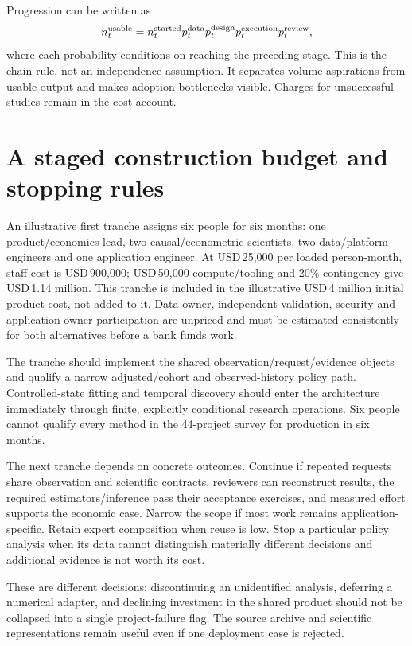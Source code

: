 Progression can be written as
\[
 n_t^{\rm usable}=n_t^{\rm started}
 p_t^{\rm data}p_t^{\rm design}p_t^{\rm execution}p_t^{\rm review},
\]
where each probability conditions on reaching the preceding stage.
This is the chain rule, not an independence assumption. It separates
volume aspirations from usable output and makes adoption bottlenecks
visible. Charges for unsuccessful studies remain in the cost account.

\section{A staged construction budget and stopping rules}
\label{r3:investment-sequence}

An illustrative first tranche assigns six people for six months:
one product/economics lead, two causal/econometric scientists, two
data/platform engineers and one application engineer. At USD\,25,000
per loaded person-month, staff cost is USD\,900,000; USD\,50,000
compute/tooling and 20\% contingency give USD\,1.14 million.
This tranche is included in the illustrative USD\,4 million initial
product cost, not added to it. Data-owner, independent validation,
security and application-owner participation are unpriced and must
be estimated consistently for both alternatives before a bank funds work.

The tranche should implement the shared observation/request/evidence
objects and qualify a narrow adjusted/cohort and observed-history
policy path. Controlled-state fitting and temporal discovery should
enter the architecture immediately through finite, explicitly conditional
research operations. Six people cannot qualify every method in the
44-project survey for production in six months.

The next tranche depends on concrete outcomes. Continue if repeated
requests share observation and scientific contracts, reviewers can
reconstruct results, the required estimators/inference pass their
acceptance exercises, and measured effort supports the economic case.
Narrow the scope if most work remains application-specific. Retain
expert composition when reuse is low. Stop a particular policy analysis
when its data cannot distinguish materially different decisions and
additional evidence is not worth its cost.

These are different decisions: discontinuing an unidentified analysis,
deferring a numerical adapter, and declining investment in the shared
product should not be collapsed into a single project-failure flag.
The source archive and scientific representations remain useful even
if one deployment case is rejected.

